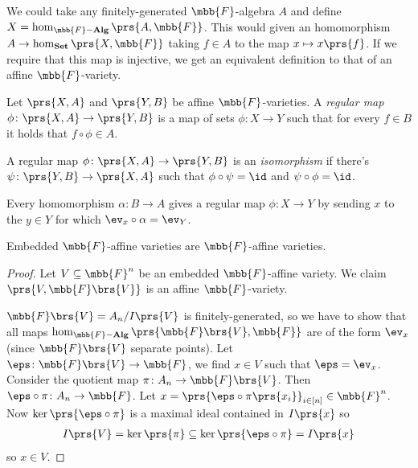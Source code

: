 \documentclass[10pt,a4paper,twoside,openany,hidelinks]{book}
\begin{document}
\begin{remark}
We could take any finitely-generated $\mbb{F}$-algebra $A$ and define $X = \hom_{\mbb{F}\mathbf{-Alg}}\prs{A,\mbb{F}}$. This would given an homomorphism $A \to \hom_{\mathbf{Set}}\prs{X,\mbb{F}}$ taking $f \in A$ to the map $x \mapsto x\prs{f}$.
If we require that this map is injective, we get an equivalent definition to that of an affine $\mbb{F}$-variety.
\end{remark}

\begin{definition}
Let $\prs{X,A}$ and $\prs{Y,B}$ be affine $\mbb{F}$-varieties. A \emph{regular map} $\phi \colon \prs{X,A} \to \prs{Y,B}$ is a map of sets $\phi \colon X \to Y$ such that for every $f \in B$ it holds that $f \circ \phi \in A$. 
\end{definition}

\begin{definition}
A regular map $\phi \colon \prs{X,A} \to \prs{Y,B}$ is an \emph{isomorphism} if there's $\psi \colon \prs{Y,B} \to \prs{X,A}$ such that $\phi \circ \psi = \id$ and $\psi \circ \phi = \id$.
\end{definition}

\begin{remark}
Every homomorphism $\alpha \colon B \to A$ gives a regular map $\phi \colon X \to Y$ by sending $x$ to the $y \in Y$ for which $\ev_x \circ \alpha = \ev_Y$.
\end{remark}

\begin{proposition}
Embedded $\mbb{F}$-affine varieties are $\mbb{F}$-affine varieties.
\end{proposition}

\begin{proof}
Let $V \subseteq \mbb{F}^n$ be an embedded $\mbb{F}$-affine variety. We claim $\prs{V, \mbb{F}\brs{V}}$ is an affine $\mbb{F}$-variety.

$\mbb{F}\brs{V} = A_n/I\prs{V}$ is finitely-generated, so we have to show that all maps $\hom_{\mbb{F}\mathbf{-Alg}}\prs{\mbb{F}\brs{V}, \mbb{F}}$ are of the form $\ev_x$ (since $\mbb{F}\brs{V}$ separate points).
Let $\eps \colon \mbb{F}\brs{V} \to \mbb{F}$, we find $x \in V$ such that $\eps = \ev_x$. Consider the quotient map $\pi \colon A_n \to \mbb{F}\brs{V}$. Then $\eps \circ \pi \colon A_n \to \mbb{F}$. Let $x = \prs{\eps \circ \pi \prs{x_i}}_{i \in [n]} \in \mbb{F}^n$. Now $\ker\prs{\eps \circ \pi}$ is a maximal ideal contained in $I\prs{x}$ so
\begin{align*}
I\prs{V} = \ker\prs{\pi} \subseteq \ker\prs{\eps \circ \pi} = I\prs{x}
\end{align*}
so $x \in V$.
\end{proof}
\end{document}
